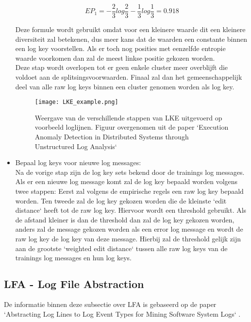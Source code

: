 \begin{itemize}
    \[EP_{1} = - \frac{2}{3}log\frac{2}{3} - \frac{1}{3}log\frac{1}{3} = 0.918\]
    
    Deze formule wordt gebruikt omdat voor een kleinere waarde dit een kleinere diversiteit zal betekenen, dus meer kans dat de waarden een constante binnen een log key voorstellen. Als er toch nog posities met eenzelfde entropie waarde voorkomen dan zal de meest linkse positie gekozen worden. \\
    
    Deze stap wordt overlopen tot er geen enkele cluster meer overblijft die voldoet aan de splitsingsvoorwaarden. Finaal zal dan het gemeenschappelijk deel van alle raw log keys binnen een cluster genomen worden als log key.\\
    
    \begin{center}
        \begin{figure}[!htp]
            \texttt{[image: LKE\_example.png]}
            \caption{Weergave van de verschillende stappen van LKE uitgevoerd op voorbeeld loglijnen. Figuur overgenomen uit de paper `Execution Anomaly Detection in Distributed Systems through Unstructured Log Analysis` \autocite{fu2009execution}}
            \label{pic:LKEstappen}
        \end{figure}
    \end{center}

    \item Bepaal log keys voor nieuwe log messages:\\
    Na de vorige stap zijn de log key sets bekend door de trainings log messages. Als er een nieuwe log message komt zal de log key bepaald worden volgens twee stappen: Eerst zal volgens de empirische regels een raw log key bepaald worden. Ten tweede zal de log key gekozen worden die de kleinste `edit distance` heeft tot de raw log key. Hiervoor wordt een threshold gebruikt. Als de afstand kleiner is dan de threshold dan zal de log key gekozen worden, anders zal de message gekozen worden als een error log message en wordt de raw log key de log key van deze message. Hierbij zal de threshold gelijk zijn aan de grootste `weighted edit distance` tussen alle raw log keys van de trainings log messages en hun log keys.
\end{itemize}

\subsection{LFA - Log File Abstraction}
De informatie binnen deze subsectie over LFA is gebaseerd op de paper `Abstracting Log Lines to Log Event Types for Mining Software System Logs` \autocite{nagappan2010abstracting}.

